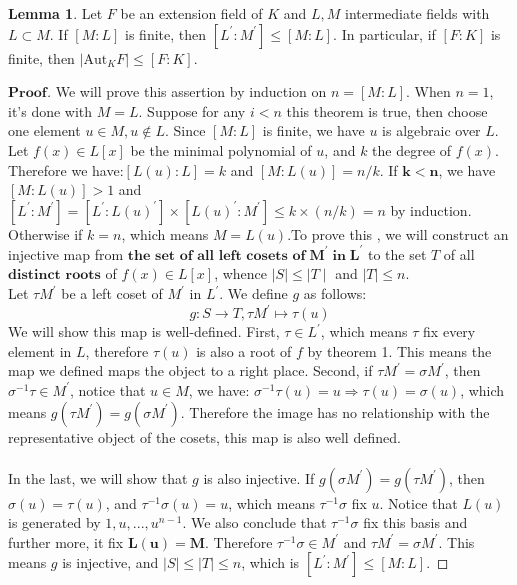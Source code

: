 \documentclass[a4paper, 11pt]{article}
\theoremstyle{remark}
\newenvironment{myprf}
{\renewcommand\qedsymbol{$ $}\begin{proof}[$\mathbf{Proof}$]}
  {\end{proof}}
\theoremstyle{definition}
\newtheorem{lemma}[theorem]{Lemma}
\begin{document}
    \begin{lemma}
            Let  $F$ be an extension field of $K$ and $L,M$ intermediate fields with 
            $L\subset M$. If $[M:L]$ is finite, then $[L^{'}:M^{'}]\leq [M:L]$. In
            particular, if $[F:K]$ is finite, then $|\mathrm{Aut}_K F|\leq [F:K]$.
    \end{lemma}
    \vspace{0.1cm}
    \begin{myprf}
        We will prove this assertion by induction on $n=[M:L]$. When $n=1$, it's done
        with $M=L$. Suppose for any $i<n$ this theorem is true, then choose one element
        $u\in M, u\notin L$. Since $[M:L]$ is finite, we have $u$ is algebraic over 
        $L$. Let $f(x)\in L[x]$ be the minimal polynomial of $u$, and $k$ the degree of 
$f(x)$. Therefore we have:$[L(u):L]=k$ and $[M:L(u)]=n/k$. If $\mathbf{k}<\mathbf{n}$, we have
        $[M:L(u)]>1$ and $[L^{'}:M^{'}]=[L^{'}:L(u)^{'}]\times [L(u)^{'}:M^{'}]\leq
        k\times (n/k)=n$ by induction.\\
        \indent Otherwise if $k=n$, which means $M=L(u)$.To prove this , 
        we will construct an injective map
        from $\textbf{the set of all left cosets of}\; \mathbf{M^{'}}\;\textbf{in}\; \mathbf{L^{'}}$ to the set $T$ of 
        all $\textbf{distinct roots}$ of $f(x)\in L[x]$, whence $\mid S\mid \leq \mid T\mid$ 
        and $\mid T \mid \leq n$. \\
        \indent
        Let $\tau M^{'}$ be a left coset of $M^{'}$ in $L^{'}$. We define $g$ as follows:
        $$
        g:S\rightarrow T, \tau M^{'}\mapsto \tau(u)
        $$ We will show this map is well-defined. First, $\tau \in L^{'}$, which means
        $\tau$ fix every element in $L$, therefore $\tau(u)$ is also a root of $f$ by 
        theorem 1. This means the map we defined maps the object to a right place. Second,
        if $\tau M^{'}=\sigma M^{'}$, then $\sigma^{-1}\tau\in M^{'}$, notice that 
        $u\in M$, we have: $\sigma^{-1}\tau(u)=u\Rightarrow \tau(u)=\sigma(u)$, which 
        means $g(\tau M^{'})=g(\sigma M^{'})$. Therefore the image has no relationship 
        with the representative object of the cosets, this map is also well defined.\\
        \vspace{0.1cm}\\
        \indent In the last, we will show that $g$ is also injective. If $g(\sigma M^{'})
        =g(\tau M^{'})$, then $\sigma(u)=\tau(u)$, and $\tau^{-1}\sigma(u)=u$, which means
        $\tau^{-1}\sigma$ fix $u$. Notice that $L(u)$ is generated by $1,u,...,u^{n-1}$.
        We also conclude that $\tau^{-1}\sigma$ fix this basis and further more, it fix
        $\mathbf{L(u)=M}$. Therefore $\tau^{-1}\sigma\in M^{'}$ and $\tau M^{'}=\sigma M^{'}$. This
        means $g$ is injective, and $\mid S\mid\leq\mid T\mid \leq n$, which is 
        $[L^{'}:M^{'}]\leq [M:L]$.
    \end{myprf}
\end{document}
